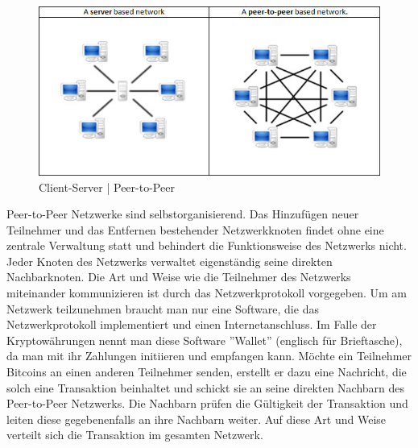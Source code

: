 \begin{figure}[H]
\centering
\includegraphics[width=1\linewidth]{Figures/p2p_networks}
\decoRule
\caption{Client-Server | Peer-to-Peer \cite{wikipedia_p2p}}
\label{fig:p2p_networks}
\end{figure}

Peer-to-Peer Netzwerke sind selbstorganisierend. Das Hinzufügen neuer Teilnehmer und das Entfernen bestehender Netzwerkknoten findet ohne eine zentrale Verwaltung statt und behindert die Funktionsweise des Netzwerks nicht. Jeder Knoten des Netzwerks verwaltet eigenständig seine direkten Nachbarknoten. Die Art und Weise wie die Teilnehmer des Netzwerks miteinander kommunizieren ist durch das Netzwerkprotokoll vorgegeben. Um am Netzwerk teilzunehmen braucht man nur eine Software, die das Netzwerkprotokoll implementiert und einen Internetanschluss. Im Falle der Kryptowährungen nennt man diese Software ''Wallet'' (englisch für Brieftasche), da man mit ihr Zahlungen initiieren und empfangen kann. Möchte ein Teilnehmer Bitcoins an einen anderen Teilnehmer senden, erstellt er dazu eine Nachricht, die solch eine Transaktion beinhaltet und schickt sie an seine direkten Nachbarn des Peer-to-Peer Netzwerks. Die Nachbarn prüfen die Gültigkeit der Transaktion und leiten diese gegebenenfalls an ihre Nachbarn weiter. Auf diese Art und Weise verteilt sich die Transaktion im gesamten Netzwerk.


